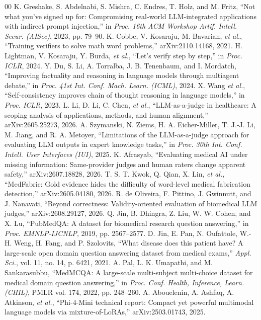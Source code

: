 \documentclass[conference]{IEEEtran}
\begin{document}
\begin{thebibliography}{00}
 K. Greshake, S. Abdelnabi, S. Mishra, C. Endres, T. Holz, and M. Fritz, ``Not what you've signed up for: Compromising real-world LLM-integrated applications with indirect prompt injection,'' in \textit{Proc. 16th ACM Workshop Artif. Intell. Secur. (AISec)}, 2023, pp. 79--90.
 K. Cobbe, V. Kosaraju, M. Bavarian, \textit{et al.}, ``Training verifiers to solve math word problems,'' arXiv:2110.14168, 2021.
 H. Lightman, V. Kosaraju, Y. Burda, \textit{et al.}, ``Let's verify step by step,'' in \textit{Proc. ICLR}, 2024.
 Y. Du, S. Li, A. Torralba, J. B. Tenenbaum, and I. Mordatch, ``Improving factuality and reasoning in language models through multiagent debate,'' in \textit{Proc. 41st Int. Conf. Mach. Learn. (ICML)}, 2024.
 X. Wang \textit{et al.}, ``Self-consistency improves chain of thought reasoning in language models,'' in \textit{Proc. ICLR}, 2023.
 L. Li, D. Li, C. Chen, \textit{et al.}, ``LLM-as-a-judge in healthcare: A scoping analysis of applications, methods, and human alignment,'' arXiv:2605.25273, 2026.
 A. Szymanski, N. Ziems, H. A. Eicher-Miller, T. J.-J. Li, M. Jiang, and R. A. Metoyer, ``Limitations of the LLM-as-a-judge approach for evaluating LLM outputs in expert knowledge tasks,'' in \textit{Proc. 30th Int. Conf. Intell. User Interfaces (IUI)}, 2025.
 K. Afrasyab, ``Evaluating medical AI under missing information: Same-provider judges and human raters change apparent safety,'' arXiv:2607.18828, 2026.
 T. S. T. Kwok, Q. Qian, X. Lin, \textit{et al.}, ``MedFabric: Gold evidence hides the difficulty of word-level medical fabrication detection,'' arXiv:2605.04180, 2026.
 R. de Oliveira, F. Pittino, J. Gwinnutt, and J. Nanavati, ``Beyond correctness: Validity-oriented evaluation of biomedical LLM judges,'' arXiv:2608.29127, 2026.
 Q. Jin, B. Dhingra, Z. Liu, W. W. Cohen, and X. Lu, ``PubMedQA: A dataset for biomedical research question answering,'' in \textit{Proc. EMNLP-IJCNLP}, 2019, pp. 2567--2577.
 D. Jin, E. Pan, N. Oufattole, W.-H. Weng, H. Fang, and P. Szolovits, ``What disease does this patient have? A large-scale open domain question answering dataset from medical exams,'' \textit{Appl. Sci.}, vol. 11, no. 14, p. 6421, 2021.
 A. Pal, L. K. Umapathi, and M. Sankarasubbu, ``MedMCQA: A large-scale multi-subject multi-choice dataset for medical domain question answering,'' in \textit{Proc. Conf. Health, Inference, Learn. (CHIL)}, PMLR vol. 174, 2022, pp. 248--260.
 A. Abouelenin, A. Ashfaq, A. Atkinson, \textit{et al.}, ``Phi-4-Mini technical report: Compact yet powerful multimodal language models via mixture-of-LoRAs,'' arXiv:2503.01743, 2025.

\end{thebibliography}
\end{document}
